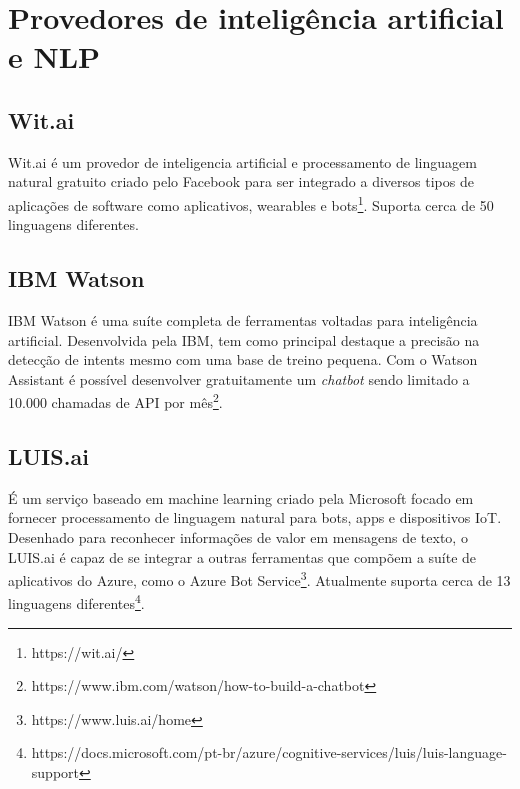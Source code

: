   \section{Provedores de inteligência artificial e NLP}
  \subsection{Wit.ai}
  Wit.ai é um provedor de inteligencia artificial e processamento de linguagem natural gratuito criado pelo Facebook para ser integrado a diversos tipos de aplicações de software como aplicativos, wearables e bots\footnote{https://wit.ai/}. Suporta cerca de 50 linguagens diferentes.
  \subsection{IBM Watson}
  IBM Watson é uma suíte completa de ferramentas voltadas para inteligência artificial. Desenvolvida pela IBM, tem como principal destaque a precisão na detecção de intents mesmo com uma base de treino pequena. Com o Watson Assistant é possível desenvolver gratuitamente um \textit{chatbot} sendo limitado a 10.000 chamadas de API por mês\footnote{https://www.ibm.com/watson/how-to-build-a-chatbot}.
  \subsection{LUIS.ai}
  É um serviço baseado em machine learning criado pela Microsoft focado em fornecer processamento de linguagem natural para bots, apps e dispositivos IoT. Desenhado para reconhecer informações de valor em mensagens de texto, o LUIS.ai é capaz de se integrar a outras ferramentas que compõem a suíte de aplicativos do Azure, como o Azure Bot Service\footnote{https://www.luis.ai/home}. Atualmente suporta cerca de 13 linguagens diferentes\footnote{https://docs.microsoft.com/pt-br/azure/cognitive-services/luis/luis-language-support}.
  
  